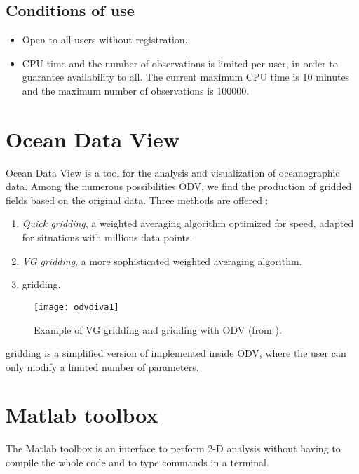 \subsection{Conditions of use}


\begin{itemize}
\item Open to all users without registration.
\item CPU time and the number of observations is limited per user, in order to guarantee availability to all. The current maximum CPU time is 10 minutes and the maximum number of observations is 100000.
\end{itemize}


\section{Ocean Data View}

Ocean Data View \citep[ODV,][]{SCHLITZER02} is a tool for the analysis and visualization of oceanographic data. Among the numerous possibilities ODV, we find the production of gridded fields based on the original data. Three methods are offered \citep{SCHLITZER12}: 
\begin{enumerate}
\item \textit{Quick gridding}, a weighted averaging algorithm optimized for speed, adapted for situations with millions data points.
\item \textit{VG gridding}, a more sophisticated weighted averaging algorithm.
\item \diva gridding.
\end{enumerate}

\begin{figure}[H]
\centering 
\texttt{[image: odvdiva1]}
\caption[Example of VG gridding and \diva gridding with ODV.]{Example of VG gridding and \diva gridding with ODV (from \citet{SCHLITZER12}).\label{fig:divaodv}}
\end{figure}

\diva gridding is a simplified version of \diva implemented inside ODV, where the user can only modify a limited number of parameters.

\section{Matlab toolbox}

The \diva Matlab toolbox is an interface to perform 2-D analysis without having to compile the whole code and to type commands in a terminal. 

